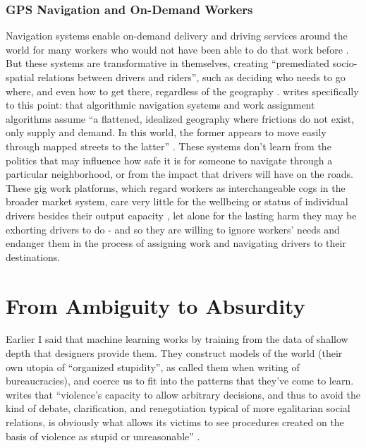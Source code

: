 \documentclass[manuscript,screen]{acmart}
\begin{document}
\subsubsection{GPS Navigation and On-Demand Workers}
Navigation systems enable on-demand delivery and driving services around the world for many workers who would not have been able to do that work before
\cite{pieceworkCrowdworkGigwork}.
But these systems are transformative in themselves, creating ``premediated socio-spatial relations between drivers and riders'', such as deciding who needs to go where, and even how to get there, regardless of the geography
\cite{chan2018mediatization}.
\citeauthor{GoJekAlgo} writes specifically to this point: that algorithmic navigation systems and work assignment algorithms assume ``a flattened, idealized geography where frictions do not exist, only supply and demand.
In this world, the former appears to move easily through mapped streets to the latter''
\cite{GoJekAlgo}.
These systems don't learn from the politics that may influence how safe it is for someone to navigate through a particular neighborhood, or from the impact that drivers will have on the roads.
These gig work platforms, which regard workers as interchangeable cogs in the broader market system, care very little for the wellbeing or status of individual drivers besides their output capacity
\cite{pieceworkCrowdworkGigwork}, let alone for the lasting harm they may be exhorting drivers to do - and so they are willing to ignore workers' needs and endanger them in the process of assigning work and navigating drivers to their destinations.



\section{From Ambiguity to Absurdity}

Earlier I said that machine learning works by training from the data of shallow depth that designers provide them.
They construct models of the world (their own utopia of ``organized stupidity'', as \citeauthor{graeber2015utopia} called them when writing of bureaucracies), and coerce us to fit into the patterns that they've come to learn.
\citeauthor{graeber2015utopia} writes that ``violence's capacity to allow arbitrary decisions, and thus to avoid the kind of debate, clarification, and renegotiation typical of more egalitarian social relations, is obviously what allows its victims to see procedures created on the basis of violence as stupid or unreasonable''
\cite{graeber2015utopia}.
\end{document}
